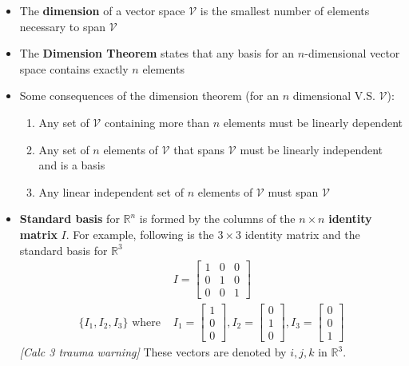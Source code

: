 \begin{itemize}
  \item The \textbf{dimension} of a vector space $\mathcal{V}$ is the smallest number of elements necessary to span $\mathcal{V}$
  \item The \textbf{Dimension Theorem} states that any basis for an $n$-dimensional vector space contains exactly $n$ elements
  \item Some consequences of the dimension theorem (for an $n$ dimensional V.S. $\mathcal{V}$):
    \begin{enumerate}[label={\arabic*)}]
      \item Any set of $\mathcal{V}$ containing more than $n$ elements must be linearly dependent
      \item Any set of $n$ elements of $\mathcal{V}$ that spans $\mathcal{V}$ must be linearly independent and is a basis
      \item Any linear independent set of $n$ elements of $\mathcal{V}$ must span $\mathcal{V}$
    \end{enumerate}
  \item \textbf{Standard basis} for $\mathbb{R}^n$ is formed by the columns of the $n \times n$ \textbf{identity matrix} $I$.
    For example, following is the $3 \times 3$ identity matrix and the standard basis for $\mathbb{R}^3$
    \begin{align*}
      &
      I = \begin{bmatrix}
        1 & 0 & 0\\ 0 & 1 & 0\\ 0 & 0 & 1
      \end{bmatrix}
      \\
      \{ I_1, I_2, I_3 \} \text{ where }
      &
      I_1 = \begin{bmatrix}
          1\\ 0\\ 0
        \end{bmatrix},
      I_2 = \begin{bmatrix}
          0\\ 1\\ 0
        \end{bmatrix},
      I_3 = \begin{bmatrix}
          0\\ 0\\ 1
        \end{bmatrix}
    \end{align*}
    \textit{[Calc 3 trauma warning]} These vectors are denoted by $i, j, k$ in $\mathbb{R}^3$.

\end{itemize}
